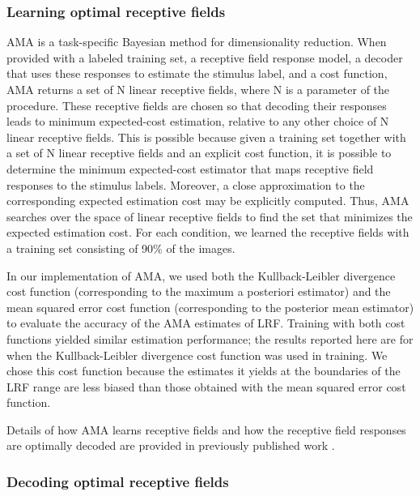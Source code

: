 \documentclass{jov}
\begin{document}
\subsubsection*{Learning optimal receptive fields}
AMA is a task-specific Bayesian method for dimensionality reduction.
When provided with a labeled training set, a receptive field response model, a decoder that uses these responses to estimate the stimulus label, and a cost function, AMA returns a set of N linear receptive fields, where N is a parameter of the procedure.
These receptive fields are chosen so that decoding their responses leads to minimum expected-cost estimation, relative to any other choice of N linear receptive fields.
This is possible because given a training set together with a set of N linear receptive fields and an explicit cost function, it is possible to determine the minimum expected-cost estimator that maps receptive field responses to the stimulus labels.
Moreover, a close approximation to the corresponding expected estimation cost may be explicitly computed.
Thus, AMA searches over the space of linear receptive fields to find the set that minimizes the expected estimation cost.
For each condition, we learned the receptive fields with a training set consisting of 90\% of the images.

In our implementation of AMA, we used both the Kullback-Leibler divergence cost function (corresponding to the maximum a posteriori estimator) and the mean squared error cost function (corresponding to the posterior mean estimator) to evaluate the accuracy of the AMA estimates of LRF.
Training with both cost functions yielded similar estimation performance; the results reported here are for when the Kullback-Leibler divergence cost function was used in training.
We chose this cost function because the estimates it yields at the boundaries of the LRF range are less biased than those obtained with the mean squared error cost function.

Details of how AMA learns receptive fields and how the receptive field responses are optimally decoded are provided in previously published work \cite{geisler2009optimal,burge2017accuracy,jaini2017linking}.

\subsubsection*{Decoding optimal receptive fields}
\end{document}
